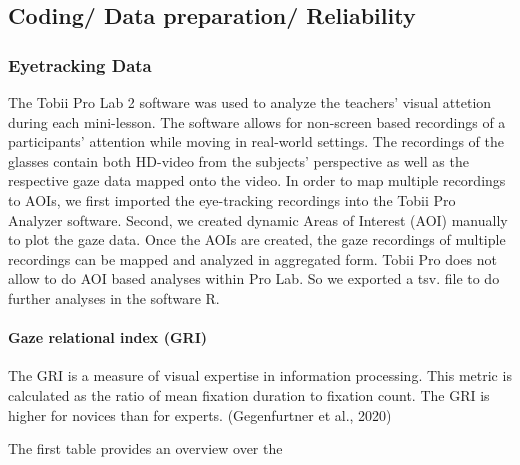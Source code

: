 \documentclass[
  english,
  man,floatsintext]{apa6}
\let\oldparagraph\paragraph
\renewcommand{\paragraph}[1]{\oldparagraph{#1}\mbox{}}
\begin{document}
\hypertarget{coding-data-preparation-reliability}{%
\subsection{Coding/ Data preparation/ Reliability}\label{coding-data-preparation-reliability}}

\hypertarget{eyetracking-data-1}{%
\subsubsection{Eyetracking Data}\label{eyetracking-data-1}}

The Tobii Pro Lab 2 software was used to analyze the teachers' visual attetion during each mini-lesson. The software allows for non-screen based recordings of a participants' attention while moving in real-world settings. The recordings of the glasses contain both HD-video from the subjects' perspective as well as the respective gaze data mapped onto the video. In order to map multiple recordings to AOIs, we first imported the eye-tracking recordings into the Tobii Pro Analyzer software. Second, we created dynamic Areas of Interest (AOI) manually to plot the gaze data. Once the AOIs are created, the gaze recordings of multiple recordings can be mapped and analyzed in aggregated form. Tobii Pro does not allow to do AOI based analyses within Pro Lab. So we exported a tsv. file to do further analyses in the software R.

\hypertarget{gaze-relational-index-gri}{%
\paragraph{Gaze relational index (GRI)}\label{gaze-relational-index-gri}}

The GRI is a measure of visual expertise in information processing. This metric is calculated as the ratio of mean fixation duration to fixation count. The GRI is higher for novices than for experts. (Gegenfurtner et al., 2020)

The first table provides an overview over the
\end{document}
